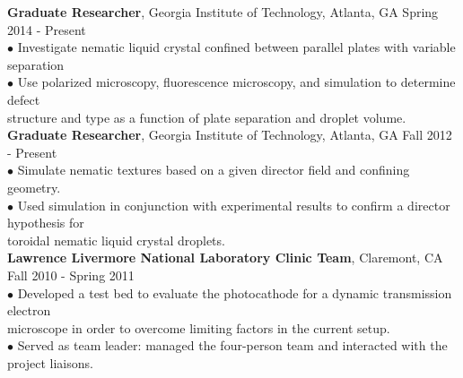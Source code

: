 \documentclass[10pt]{article}
\begin{document}
{\bf Graduate Researcher}, Georgia Institute of Technology, Atlanta, GA \hfill Spring 2014 - Present\\
\hspace*{10pt}$\bullet$ Investigate nematic liquid crystal confined between parallel plates with variable separation\\
\hspace*{10pt}$\bullet$ Use polarized microscopy, fluorescence microscopy, and simulation to determine defect \\ \hspace*{15pt} structure and type as a function of plate separation and droplet volume.\\

{\bf Graduate Researcher}, Georgia Institute of Technology, Atlanta, GA \hfill Fall 2012 - Present\\
\hspace*{10pt}$\bullet$ Simulate nematic textures based on a given director field and confining geometry.\\
\hspace*{10pt}$\bullet$ Used simulation in conjunction with experimental results to confirm a director hypothesis for \\ \hspace*{15pt} toroidal nematic liquid crystal droplets.\\




{\bf Lawrence Livermore National Laboratory Clinic Team}, Claremont, CA \hfill Fall 2010 - Spring 2011\\
\hspace*{10pt}$\bullet$ Developed a test bed to evaluate the photocathode for a dynamic transmission electron \\ \hspace*{15pt} microscope in order to overcome limiting factors in the current setup.\\
\hspace*{10pt}$\bullet$ Served as team leader: managed the four-person team and interacted with the project liaisons.\\
\end{document}
